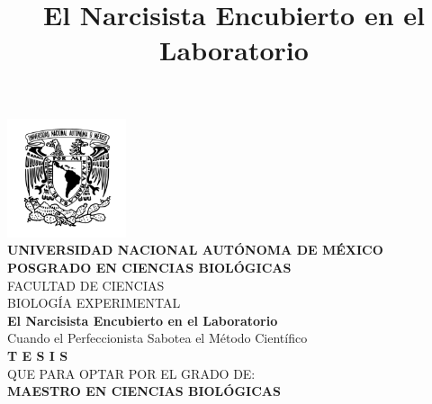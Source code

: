 \documentclass[
]{article}
\title{El Narcisista Encubierto en el Laboratorio}
\begin{document}

\pagestyle{plain} %


\begin{titlepage}
    \begin{center}
        \vspace*{-1.5cm} %
        
        \includegraphics[width=3.5cm]{ figuras/unam.png }\\[0.5cm]
        
        {\large \textbf{UNIVERSIDAD NACIONAL AUTÓNOMA DE MÉXICO}}\\[0.4cm]
        
        {\large \textbf{\MakeUppercase{Posgrado en Ciencias
Biológicas}}}\\[0.3cm]
        
        {\large \MakeUppercase{Facultad de Ciencias}}\\[0.2cm]
        {\large \MakeUppercase{Biología Experimental}}\\[1cm]
        
        {\Large \textbf{El Narcisista Encubierto en el
Laboratorio}}\\[1cm]
        {\small  Cuando el Perfeccionista Sabotea el Método
Científico }\\[1cm]
        
        {\LARGE \textbf{T E S I S}}\\[0.5cm]
        
        {\large QUE PARA OPTAR POR EL GRADO DE:}\\[0.3cm]
        {\Large \textbf{MAESTRO EN CIENCIAS BIOLÓGICAS}}\\[1cm]
        

\end{center}
\end{titlepage}
\end{document}
